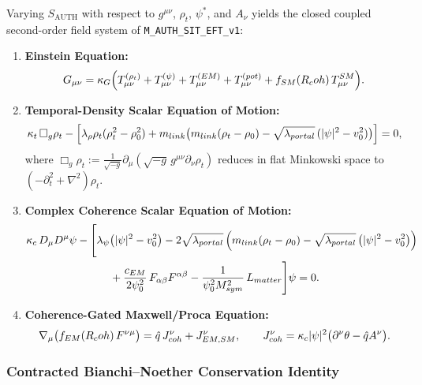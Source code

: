 Varying $S_{\mathrm{AUTH}}$ with respect to $g^{\mu\nu}$, $\rho_t$, $\psi^*$, and $A_\nu$ yields the closed coupled second-order field system of \texttt{M\_AUTH\_SIT\_EFT\_v1}:
\begin{enumerate}[leftmargin=2em]
  \item \textbf{Einstein Equation:}
  \begin{equation}
  G_{\mu\nu} = \kappa_G\Bigl(T_{\mu\nu}^{(\rho_t)} + T_{\mu\nu}^{(\psi)} + T_{\mu\nu}^{(\mathrm{EM})} + T_{\mu\nu}^{(\mathrm{pot})} + f_{\mathrm{SM}}(\Rcoh)\,T_{\mu\nu}^{\mathrm{SM}}\Bigr).
  \label{eq:covariant_einstein_sec5}
  \end{equation}
  \item \textbf{Temporal-Density Scalar Equation of Motion:}
  \begin{equation}
  \kappa_t\,\Box_g\rho_t
  - \Bigl[\lambda_\rho\rho_t(\rho_t^2 - \rho_0^2) + m_{\mathrm{link}}\bigl(m_{\mathrm{link}}(\rho_t - \rho_0) - \sqrt{\lambda_{\mathrm{portal}}}\,(|\psi|^2 - v_0^2)\bigr)\Bigr] = 0,
  \label{eq:rhot_eom_canonical}
  \end{equation}
  where $\Box_g\rho_t := \frac{1}{\sqrt{-g}}\partial_\mu(\sqrt{-g}\,g^{\mu\nu}\partial_\nu\rho_t)$ reduces in flat Minkowski space to $(-\partial_t^2 + \nabla^2)\rho_t$.
  \item \textbf{Complex Coherence Scalar Equation of Motion:}
  \begin{align}
  \kappa_c\,D_\mu D^\mu\psi
  &- \Biggl[
    \lambda_\psi\bigl(|\psi|^2 - v_0^2\bigr)
    - 2\sqrt{\lambda_{\mathrm{portal}}}\,\Bigl(m_{\mathrm{link}}(\rho_t - \rho_0) - \sqrt{\lambda_{\mathrm{portal}}}\,\bigl(|\psi|^2 - v_0^2\bigr)\Bigr)
    \nonumber\\
  &\qquad\quad
    + \frac{c_{\mathrm{EM}}}{2\psi_0^2}\,F_{\alpha\beta}F^{\alpha\beta}
    - \frac{1}{\psi_0^2 M_{\mathrm{sym}}^2}\,\mathcal{L}_{\mathrm{matter}}
  \Biggr]\psi = 0.
  \label{eq:Rcoh-eom}
  \end{align}
  \item \textbf{Coherence-Gated Maxwell/Proca Equation:}
  \begin{equation}
  \nabla_\mu\bigl(f_{\mathrm{EM}}(\Rcoh)\,F^{\nu\mu}\bigr)
  = \hat{q}\,J^\nu_{\mathrm{coh}} + J^\nu_{\mathrm{EM,SM}},
  \qquad
  J^\nu_{\mathrm{coh}} = \kappa_c|\psi|^2\bigl(\partial^\nu\theta - \hat{q}A^\nu\bigr).
  \label{eq:maxwell_proca_eom_canonical}
  \end{equation}
\end{enumerate}

\subsubsection{Contracted Bianchi--Noether Conservation Identity}

